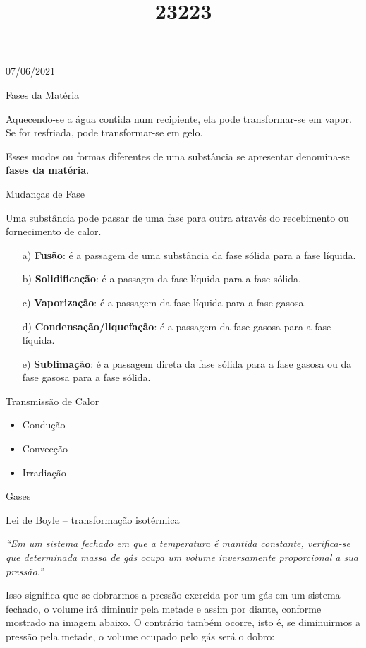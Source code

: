 \documentclass{SchoolBook}
\begin{document}
    \begin{day}{07/06/2021}
        \title{2}{Fases da Matéria}
        
        Aquecendo-se a água contida num recipiente, ela pode transformar-se em vapor. Se for resfriada, pode transformar-se em gelo.
        
        Esses modos ou formas diferentes de uma substância se apresentar denomina-se \textbf{fases da matéria}.
        
        \title{3}{Mudanças de Fase}
        
        Uma substância pode passar de uma fase para outra através do recebimento ou fornecimento de calor.
        
        \begin{enumerate}[nosep]
            \item[a)] \textbf{Fusão}: é a passagem de uma substância da fase sólida para a fase líquida.
            \item[b)] \textbf{Solidificação}: é a passagm da fase líquida para a fase sólida.
            \item[c)] \textbf{Vaporização}: é a passagem da fase líquida para a fase gasosa.
            \item[d)] \textbf{Condensação/liquefação}: é a passagem da fase gasosa para a fase líquida.
            \item[e)] \textbf{Sublimação}: é a passagem direta da fase sólida para a fase gasosa ou da fase gasosa para a fase sólida.
        \end{enumerate}
        
        \title{2}{Transmissão de Calor}
        
        \begin{itemize}[nosep]
            \item Condução
            \item Convecção
            \item Irradiação
        \end{itemize}
        
        \title{2}{Gases}
        
        \title{3}{Lei de Boyle -- transformação isotérmica}
        
	\begin{center}
        	\emph{“Em um sistema fechado em que a temperatura é mantida constante, verifica-se que determinada massa de gás ocupa um volume inversamente proporcional a sua pressão.”}
	\end{center}        

        Isso significa que se dobrarmos a pressão exercida por um gás em um sistema fechado, o volume irá diminuir pela metade e assim por diante, conforme mostrado na imagem abaixo. O contrário também ocorre, isto é, se diminuirmos a pressão pela metade, o volume ocupado pelo gás será o dobro:
        
        \vspace{12pt}
    \end{day}
    
\end{document}
